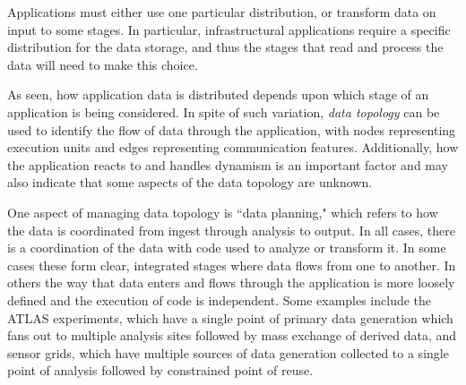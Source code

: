 
Applications must either use one particular distribution, or transform data on
input to some stages. In particular, infrastructural applications require a
specific distribution for the data storage, and thus the stages that read and
process the data will need to make this choice.

As seen, how application data is distributed depends upon which stage of an
application is being considered. In spite of such variation, {\it data topology}
can be used to identify the flow of data through the application, with nodes
representing execution units and edges representing communication features.
Additionally, how the application reacts to and handles dynamism is an important
factor and may also indicate that some aspects of the data topology are unknown.



One aspect of managing data topology is ``data planning," which refers
to how the data is coordinated from ingest through analysis to
output. In all cases, there is a coordination of the data with code
used to analyze or transform it. In some cases these form clear,
integrated stages where data flows from one to another. In others the
way that data enters and flows through the application is more loosely
defined and the execution of code is independent. Some examples
include the ATLAS experiments, which have a single point of primary
data generation which fans out to multiple analysis sites followed by
mass exchange of derived data, and sensor grids, which have multiple
sources of data generation collected to a single point of analysis
followed by constrained point of reuse.

